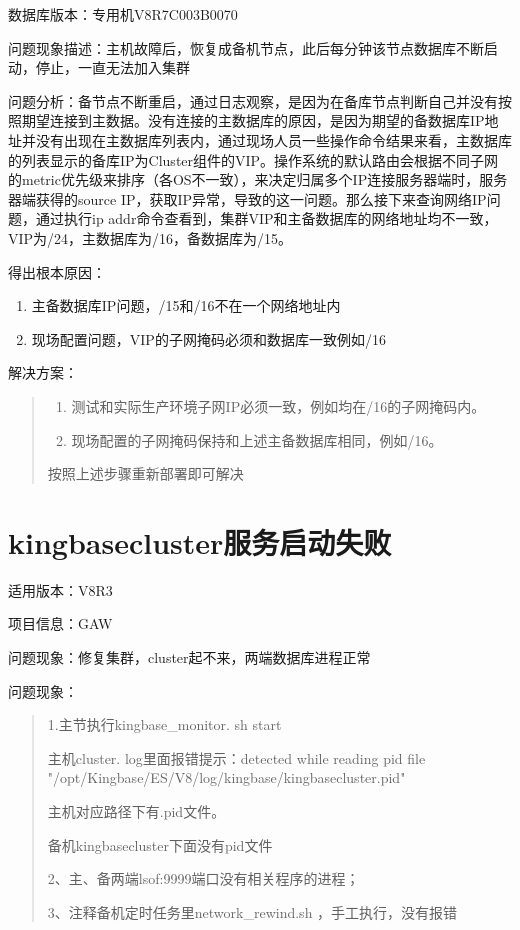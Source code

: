 \documentclass[letterpaper,10pt,english]{sphinxmanual}
\begin{document}
数据库版本：专用机V8R7C003B0070

问题现象描述：主机故障后，恢复成备机节点，此后每分钟该节点数据库不断启动，停止，一直无法加入集群

问题分析：备节点不断重启，通过日志观察，是因为在备库节点判断自己并没有按照期望连接到主数据。没有连接的主数据库的原因，是因为期望的备数据库IP地址并没有出现在主数据库列表内，通过现场人员一些操作命令结果来看，主数据库的列表显示的备库IP为Cluster组件的VIP。操作系统的默认路由会根据不同子网的metric优先级来排序（各OS不一致），来决定归属多个IP连接服务器端时，服务器端获得的source IP，获取IP异常，导致的这一问题。那么接下来查询网络IP问题，通过执行ip addr命令查看到，集群VIP和主备数据库的网络地址均不一致，VIP为/24，主数据库为/16，备数据库为/15。

得出根本原因：
\begin{enumerate}
%
\item {} 
主备数据库IP问题，/15和/16不在一个网络地址内

\item {} 
现场配置问题，VIP的子网掩码必须和数据库一致例如/16

\end{enumerate}

解决方案：
\begin{quote}
\begin{enumerate}
%
\item {} 
测试和实际生产环境子网IP必须一致，例如均在/16的子网掩码内。

\item {} 
现场配置的子网掩码保持和上述主备数据库相同，例如/16。

\end{enumerate}

按照上述步骤重新部署即可解决
\end{quote}


\section{kingbasecluster服务启动失败}
\label{\detokenize{cluster_faq:kingbasecluster}}
适用版本：V8R3

项目信息：GAW

问题现象：修复集群，cluster起不来，两端数据库进程正常

问题现象：
\begin{quote}

1.主节执行kingbase\_monitor. sh start

主机cluster. log里面报错提示：detected while reading pid file "/opt/Kingbase/ES/V8/log/kingbase/kingbasecluster.pid"

主机对应路径下有.pid文件。

备机kingbasecluster下面没有pid文件

2、主、备两端lsof:9999端口没有相关程序的进程；

3、注释备机定时任务里network\_rewind.sh ，手工执行，没有报错
\end{quote}
\end{document}
